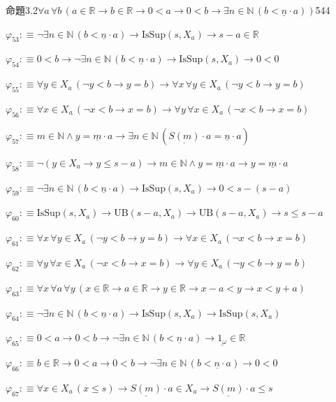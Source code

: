 \begin{fullproof}{命題3.2}{$\forall a\,\forall b\,(a \in \mathbb{R} \to b \in \mathbb{R} \to 0 < a \to 0 < b \to \exists n \in \mathbb{N}\,(b < \underline{n} \cdot a))$}{544}
\begin{abbrevlist}
\item $\varphi_{53} :\equiv \neg \exists n \in \mathbb{N}\,(b < \underline{n} \cdot a) \to \mathrm{IsSup}(s,X_{a}) \to s - a \in \mathbb{R}$
\item $\varphi_{54} :\equiv 0 < b \to \neg \exists n \in \mathbb{N}\,(b < \underline{n} \cdot a) \to \mathrm{IsSup}(s,X_{a}) \to 0 < 0$
\item $\varphi_{55} :\equiv \forall y \in X_{a}\,(\neg y < b \to y = b) \to \forall x\,\forall y \in X_{a}\,(\neg y < b \to y = b)$
\item $\varphi_{56} :\equiv \forall x \in X_{a}\,(\neg x < b \to x = b) \to \forall y\,\forall x \in X_{a}\,(\neg x < b \to x = b)$
\item $\varphi_{57} :\equiv m \in \mathbb{N} \land y = \underline{m} \cdot a \to \exists n \in \mathbb{N}\,(\underline{S(m)} \cdot a = \underline{n} \cdot a)$
\item $\varphi_{58} :\equiv \neg (y \in X_{a} \to y \leq s - a) \to m \in \mathbb{N} \land y = \underline{m} \cdot a \to y = \underline{m} \cdot a$
\item $\varphi_{59} :\equiv \neg \exists n \in \mathbb{N}\,(b < \underline{n} \cdot a) \to \mathrm{IsSup}(s,X_{a}) \to 0 < s - (s - a)$
\item $\varphi_{60} :\equiv \mathrm{IsSup}(s,X_{a}) \to \mathrm{UB}(s - a,X_{a}) \to \mathrm{UB}(s - a,X_{a}) \to s \leq s - a$
\item $\varphi_{61} :\equiv \forall x\,\forall y \in X_{a}\,(\neg y < b \to y = b) \to \forall x \in X_{a}\,(\neg x < b \to x = b)$
\item $\varphi_{62} :\equiv \forall y\,\forall x \in X_{a}\,(\neg x < b \to x = b) \to \forall y \in X_{a}\,(\neg y < b \to y = b)$
\item $\varphi_{63} :\equiv \forall x\,\forall a\,\forall y\,(x \in \mathbb{R} \to a \in \mathbb{R} \to y \in \mathbb{R} \to x - a < y \to x < y + a)$
\item $\varphi_{64} :\equiv \neg \exists n \in \mathbb{N}\,(b < \underline{n} \cdot a) \to \mathrm{IsSup}(s,X_{a}) \to \mathrm{IsSup}(s,X_{a})$
\item $\varphi_{65} :\equiv 0 < a \to 0 < b \to \neg \exists n \in \mathbb{N}\,(b < \underline{n} \cdot a) \to \underline{1_{\omega}} \in \mathbb{R}$
\item $\varphi_{66} :\equiv b \in \mathbb{R} \to 0 < a \to 0 < b \to \neg \exists n \in \mathbb{N}\,(b < \underline{n} \cdot a) \to 0 < 0$
\item $\varphi_{67} :\equiv \forall x \in X_{a}\,(x \leq s) \to \underline{S(m)} \cdot a \in X_{a} \to \underline{S(m)} \cdot a \leq s$

\end{abbrevlist}
\end{fullproof}
